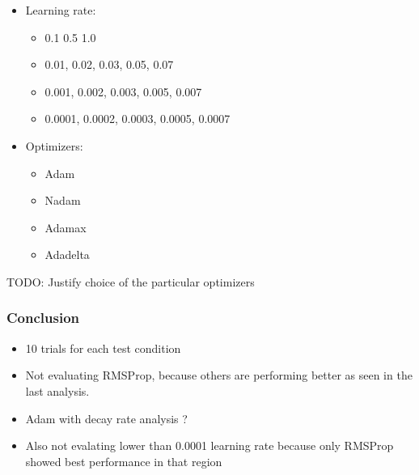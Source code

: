 \begin{itemize}
 \item Learning rate:
  \begin{itemize}
    \item 0.1 0.5 1.0 %
    \item 0.01, 0.02, 0.03, 0.05, 0.07
    \item 0.001, 0.002, 0.003, 0.005, 0.007
    \item 0.0001, 0.0002, 0.0003, 0.0005, 0.0007
  \end{itemize}
 \item Optimizers:
 \begin{itemize}
    \item Adam
    \item Nadam
    \item Adamax
    \item Adadelta
 \end{itemize}
\end{itemize}
TODO: Justify choice of the particular optimizers



\subsubsection{Conclusion} 
\begin{itemize}
    \item 10 trials for each test condition
    \item Not evaluating RMSProp, because others are performing better as seen in the last analysis. 
    \item Adam with decay rate analysis ?
    \item Also not evalating lower than 0.0001 learning rate because only RMSProp showed best performance in that region
\end{itemize}


